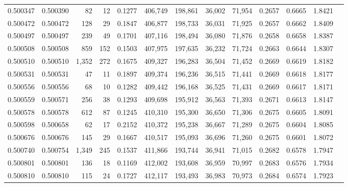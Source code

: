 \begin{tabular}{rrrrrrrrrrrrr}
0.500347 & 0.500390 &    82 &    12 &                                     0.1277 & 406,749 & 198,861 &  36,002 &  71,954 & 0.2657 & 0.6665 & 1.8421 \\
0.500472 & 0.500472 &   128 &    29 &                                     0.1847 & 406,877 & 198,733 &  36,031 &  71,925 & 0.2657 & 0.6662 & 1.8409 \\
0.500497 & 0.500497 &   239 &    49 &                                     0.1701 & 407,116 & 198,494 &  36,080 &  71,876 & 0.2658 & 0.6658 & 1.8387 \\
0.500508 & 0.500508 &   859 &   152 &                                     0.1503 & 407,975 & 197,635 &  36,232 &  71,724 & 0.2663 & 0.6644 & 1.8307 \\
0.500510 & 0.500510 & 1,352 &   272 &                                     0.1675 & 409,327 & 196,283 &  36,504 &  71,452 & 0.2669 & 0.6619 & 1.8182 \\
0.500531 & 0.500531 &    47 &    11 &                                     0.1897 & 409,374 & 196,236 &  36,515 &  71,441 & 0.2669 & 0.6618 & 1.8177 \\
0.500556 & 0.500556 &    68 &    10 &                                     0.1282 & 409,442 & 196,168 &  36,525 &  71,431 & 0.2669 & 0.6617 & 1.8171 \\
0.500559 & 0.500571 &   256 &    38 &                                     0.1293 & 409,698 & 195,912 &  36,563 &  71,393 & 0.2671 & 0.6613 & 1.8147 \\
0.500578 & 0.500578 &   612 &    87 &                                     0.1245 & 410,310 & 195,300 &  36,650 &  71,306 & 0.2675 & 0.6605 & 1.8091 \\
0.500598 & 0.500658 &    62 &    17 &                                     0.2152 & 410,372 & 195,238 &  36,667 &  71,289 & 0.2675 & 0.6604 & 1.8085 \\
0.500676 & 0.500676 &   145 &    29 &                                     0.1667 & 410,517 & 195,093 &  36,696 &  71,260 & 0.2675 & 0.6601 & 1.8072 \\
0.500740 & 0.500754 & 1,349 &   245 &                                     0.1537 & 411,866 & 193,744 &  36,941 &  71,015 & 0.2682 & 0.6578 & 1.7947 \\
0.500801 & 0.500801 &   136 &    18 &                                     0.1169 & 412,002 & 193,608 &  36,959 &  70,997 & 0.2683 & 0.6576 & 1.7934 \\
0.500810 & 0.500810 &   115 &    24 &                                     0.1727 & 412,117 & 193,493 &  36,983 &  70,973 & 0.2684 & 0.6574 & 1.7923 \\

\end{tabular}
